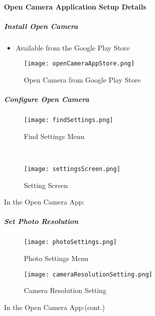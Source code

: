  \vspace{3.5in}

 \clearpage
 \paragraph{Open Camera Application Setup Details}
 \subparagraph{Install Open Camera}
 \begin{itemize}
 \item Available from the Google Play Store
 \end{itemize}
 \begin{figure}[h!]
 \centering
     \texttt{[image: openCameraAppStore.png]}
 \caption{Open Camera from Google Play Store}
 \end{figure}

 \clearpage
 \subparagraph{Configure Open Camera}
 \begin{wrapfigure}{r}{0.5\textwidth}
 \centering
     \texttt{[image: findSettings.png]}
 \caption{Find Settings Menu}
 \vspace{.25in}

 \HRule \\[.4cm] %
 \vspace{.25in}

     \texttt{[image: settingsScreen.png]}
 \caption{Setting Screen}
 \end{wrapfigure}
 In the Open Camera App:
 \vspace{2.5in}

 \vspace{3in}

 \clearpage
 \subparagraph*{Set Photo Resolution}
 \begin{wrapfigure}{r}{0.5\textwidth}
 \centering
     \texttt{[image: photoSettings.png]}
 \vspace{-.1in}

 \caption{Photo Settings Menu}

 \vspace{-.1in}

 \HRule %
 \vspace{.05in}

     \texttt{[image: cameraResolutionSetting.png]}
 \vspace{-.1in}

 \caption{Camera Resolution Setting}
 \end{wrapfigure}
 In the Open Camera App:{\tiny (cont.)}
 \vspace{.2in}


